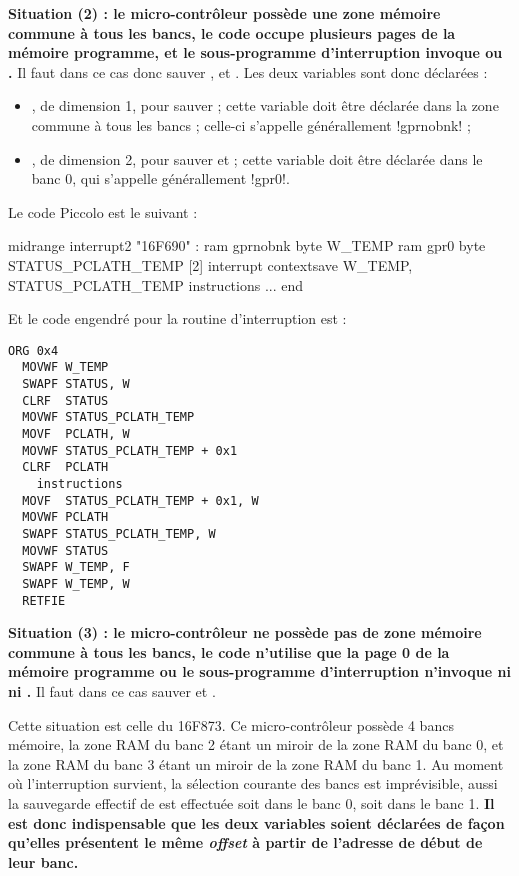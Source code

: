 \begin{piccolo}
\textbf{Situation (2) : le micro-contrôleur possède une zone mémoire commune à tous les bancs, le code occupe plusieurs pages de la mémoire programme, et le sous-programme d'interruption invoque  ou .} Il faut dans ce cas donc sauver ,  et . Les deux variables sont donc déclarées :
\begin{itemize}
  \item {}, de dimension 1, pour sauver  ; cette variable doit être déclarée dans la zone commune à tous les bancs ; celle-ci s'appelle générallement \pic!gprnobnk! ; 
  \item {}, de dimension 2, pour sauver  et   ; cette variable doit être déclarée dans le banc 0, qui s'appelle générallement \pic!gpr0!. 
\end{itemize}



Le code Piccolo est le suivant :
\begin{piccolo}
midrange interrupt2 "16F690" :
ram gprnobnk {
  byte W_TEMP
}
ram gpr0 {
  byte STATUS_PCLATH_TEMP [2]
}
interrupt contextsave W_TEMP, STATUS_PCLATH_TEMP {
  instructions
}
...
end
\end{piccolo}

Et le code engendré pour la routine d'interruption est :
\begin{lstlisting}[language=assembleur]
  ORG 0x4
  MOVWF W_TEMP
  SWAPF STATUS, W
  CLRF  STATUS
  MOVWF STATUS_PCLATH_TEMP
  MOVF  PCLATH, W
  MOVWF STATUS_PCLATH_TEMP + 0x1
  CLRF  PCLATH
    instructions
  MOVF  STATUS_PCLATH_TEMP + 0x1, W
  MOVWF PCLATH
  SWAPF STATUS_PCLATH_TEMP, W
  MOVWF STATUS
  SWAPF W_TEMP, F
  SWAPF W_TEMP, W
  RETFIE
\end{lstlisting}







\textbf{Situation (3) : le micro-contrôleur ne possède pas de zone mémoire commune à tous les bancs, le code n'utilise que la page 0 de la mémoire programme ou le sous-programme d'interruption n'invoque ni  ni .} Il faut dans ce cas sauver  et .

Cette situation est celle du 16F873. Ce micro-contrôleur possède 4 bancs mémoire, la zone RAM du banc 2 étant un miroir de la zone RAM du banc 0, et la zone RAM du banc 3 étant un miroir de la zone RAM du banc 1. Au moment où l'interruption survient, la sélection courante des bancs est imprévisible, aussi la sauvegarde effectif de  est effectuée soit dans le banc 0, soit dans le banc 1. \textbf{Il est donc indispensable que les deux variables soient déclarées de façon qu'elles présentent le même \emph{offset} à partir de l'adresse de début de leur banc.}


\end{piccolo}
